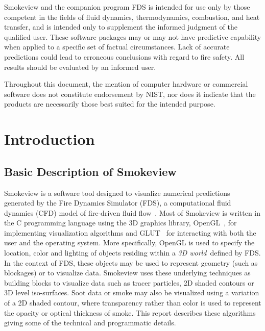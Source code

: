 \documentclass[11pt,twoside]{book}
\begin{document}
Smokeview and the companion program FDS is intended for use only
by those competent in the fields of fluid dynamics,
thermodynamics, combustion, and heat transfer, and is intended
only to supplement the informed judgment of the qualified user.
These software packages may or may not have predictive capability
when applied to a specific set of factual circumstances. Lack of
accurate predictions could lead to erroneous conclusions with
regard to fire safety. All results should be evaluated by an
informed user.

Throughout this document, the mention of computer hardware or
commercial software does not constitute endorsement by NIST, nor
does it indicate that the products are necessarily those best
suited for the intended purpose.

%
%



\cleardoublepage
\tableofcontents

\cleardoublepage
\listoffigures

\mainmatter


%
%

\chapter{Introduction}
\section{Basic Description of Smokeview}
Smokeview is a software tool designed to visualize numerical predictions generated by the Fire Dynamics Simulator (FDS), a computational fluid dynamics (CFD) model of fire-driven fluid flow~\cite{FDS_Tech_Guide,FDS_Users_Guide}. Most of Smokeview is written in the C programming language using the 3D graphics library, OpenGL~\cite{OpenGLRed}, for implementing visualization algorithms and GLUT~\cite{OpenGLGlut} for interacting with both the user and the operating system. More specifically, OpenGL is used to specify the location, color and lighting of objects residing within a {\em 3D world}\ defined by FDS. In the context of FDS, these objects may be used to represent geometry (such as blockages) or to visualize data. Smokeview uses these underlying techniques as building blocks to visualize data such as tracer particles, 2D shaded contours or 3D level iso-surfaces.  Soot data or smoke may also be visualized using a variation of a 2D shaded contour, where transparency rather than color is used to represent the opacity or optical thickness of smoke. This report describes these algorithms giving some of the technical and programmatic details.
\end{document}
